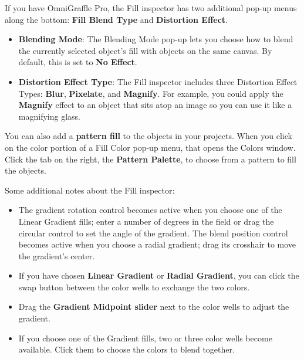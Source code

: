 \documentclass[../main.tex]{subfiles}
\begin{document}
\begin{ogpro}
  If you have OmniGraffle Pro, the Fill inspector has two additional pop-up menus along the
  bottom: \textbf{Fill Blend Type} and \textbf{Distortion Effect}.


  \begin{itemize}
    \item \textbf{Blending Mode}: The Blending Mode pop-up lets you choose how to blend the
      currently selected object's fill with objects on the same canvas. By default, this is set
      to \textbf{No Effect}.

    \item \textbf{Distortion Effect Type}: The Fill inspector includes three Distortion Effect
      Types: \textbf{Blur}, \textbf{Pixelate}, and \textbf{Magnify}. For example, you could
      apply the \textbf{Magnify} effect to an object that sits atop an image so you can use it
      like a magnifying glass.



  \end{itemize}

  You can also add a \textbf{pattern fill} to the objects in your projects. When you click on
  the color portion of a Fill Color pop-up menu, that opens the Colors window. Click the tab
  on the right, the \textbf{Pattern Palette}, to choose from a pattern to fill the objects.

\end{ogpro}

Some additional notes about the Fill inspector:

\begin{itemize}
  \item The gradient rotation control becomes active when you choose one of the Linear Gradient
    fills; enter a number of degrees in the field or drag the circular control to set the angle
    of the gradient. The blend position control becomes active when you choose a radial
    gradient; drag its crosshair to move the gradient's center.
  \item If you have chosen \textbf{Linear Gradient} or \textbf{Radial Gradient}, you can click
    the swap button between the color wells to exchange the two colors.

  \item Drag the \textbf{Gradient Midpoint slider} next to the color wells to adjust the
    gradient.
  \item If you choose one of the Gradient fills, two or three color wells become available.
    Click them to choose the colors to blend together.
\end{itemize}
\end{document}
